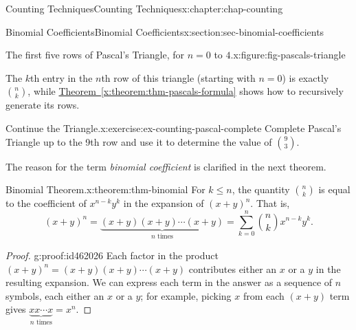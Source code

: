\documentclass[oneside,10pt,]{book}
\newcommand{\xreffont}{\relax}
\numberwithin{equation}{section}
\begin{document}
\begin{chapterptx}{Counting Techniques}{}{Counting Techniques}{}{}{x:chapter:chap-counting}
\begin{sectionptx}{Binomial Coefficients}{}{Binomial Coefficients}{}{}{x:section:sec-binomial-coefficients}
\begin{figureptx}{The first five rows of Pascal's Triangle, for \(n = 0\) to \(4\).}{x:figure:fig-pascals-triangle}{}
\begin{image}{0.3}{0.4}{0.3}
{
}%
\end{image}%
\tcblower
\end{figureptx}%
The \(k\)th entry in the \(n\)th row of this triangle (starting with \(n=0\)) is exactly \(\displaystyle\binom{n}{k}\), while \hyperref[x:theorem:thm-pascals-formula]{Theorem~{\xreffont\ref{x:theorem:thm-pascals-formula}}} shows how to recursively generate its rows.%
\begin{inlineexercise}{Continue the Triangle.}{x:exercise:ex-counting-pascal-complete}%
Complete Pascal's Triangle up to the 9th row and use it to determine the value of \(\displaystyle\binom{9}{3}\).%
\end{inlineexercise}
The reason for the term \emph{binomial coefficient} is clarified in the next theorem.%
\begin{theorem}{Binomial Theorem.}{}{x:theorem:thm-binomial}%
For \(k \leq n\), the quantity \(\displaystyle\binom{n}{k}\) is equal to the coefficient of \(x^{n-k}y^k\) in the expansion of \((x+y)^n\). That is,%
\begin{equation*}
(x+y)^n = \underbrace{(x+y)(x+y)\cdots(x+y)}_\text{$n$ times} = \displaystyle\sum_{k=0}^n \binom{n}{k}x^{n-k}y^k\text{.}
\end{equation*}
%
\end{theorem}
\begin{proof}{}{g:proof:id462026}
Each factor in the product \((x+y)^n = (x+y)(x+y)\cdots(x+y)\) contributes either an \(x\) or a \(y\) in the resulting expansion. We can express each term in the answer as a sequence of \(n\) symbols, each either an \(x\) or a \(y\); for example, picking \(x\) from each \((x+y)\) term gives \(\underbrace{xx\cdots x}_\text{$n$ times}=x^n\).%

\end{proof}
\end{sectionptx}
\end{chapterptx}
\end{document}
